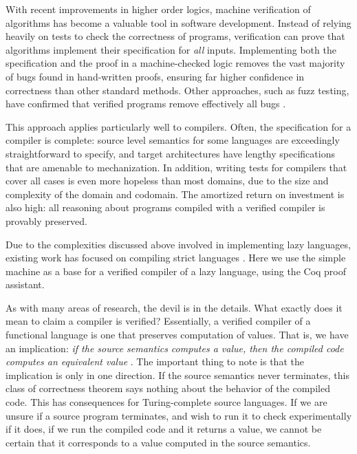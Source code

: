 With recent improvements in higher order logics, machine verification of
algorithms has become a valuable tool in software development. Instead of
relying heavily on tests to check the correctness of programs, verification can
prove that algorithms implement their specification for \emph{all} inputs.
Implementing both the specification and the proof in a machine-checked logic
removes the vast majority of bugs found in hand-written proofs, ensuring far
higher confidence in correctness than other standard methods. Other approaches,
such as fuzz testing, have confirmed that verified programs remove effectively
all bugs \cite{yangfuzz}.

This approach applies particularly well to compilers. Often, the specification
for a compiler is complete: source level semantics for some languages are
exceedingly straightforward to specify, and target architectures have lengthy
specifications that are amenable to mechanization. In addition, writing tests
for compilers that cover all cases is even more hopeless than most domains, due
to the size and complexity of the domain and codomain. The amortized return on
investment is also high: all reasoning about programs compiled with a verified
compiler is provably preserved. 

Due to the complexities discussed above involved in implementing lazy languages,
existing work has focused on compiling strict languages
\cite{chlipala2007certified, leroy2012compcert, cakeml14}. Here we use the
simple \ce machine as a base for a verified compiler of a lazy language, using
the Coq proof assistant. 

As with many areas of research, the devil is in the details. What exactly does
it mean to claim a compiler is verified?  Essentially, a verified compiler of a
functional language is one that preserves computation of values. That is, we
have an implication: \emph{if the source semantics computes a
value, then the compiled code computes an equivalent value}
\cite{chlipala2007certified}. The important thing to note is that the
implication is only in one direction. If the source semantics never terminates,
this class of correctness theorem says nothing about the behavior of the
compiled code. This has consequences for Turing-complete source languages. If we
are unsure if a source program terminates, and wish to run it to check
experimentally if it does, if we run the compiled code and it returns a value,
we cannot be certain that it corresponds to a value computed in the source
semantics. 

